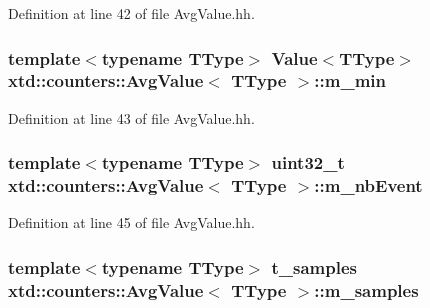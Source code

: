 Definition at line 42 of file Avg\+Value.\+hh.

\subsubsection[{\texorpdfstring{m\+\_\+min}{m_min}}]{\setlength{\rightskip}{0pt plus 5cm}template$<$typename T\+Type$>$ {\bf Value}$<$T\+Type$>$ {\bf xtd\+::counters\+::\+Avg\+Value}$<$ T\+Type $>$\+::m\+\_\+min\hspace{0.3cm}{\ttfamily [protected]}}\hypertarget{classxtd_1_1counters_1_1AvgValue_a8e217891d937894812b5edfcf6a5ce0e}{}\label{classxtd_1_1counters_1_1AvgValue_a8e217891d937894812b5edfcf6a5ce0e}


Definition at line 43 of file Avg\+Value.\+hh.

\subsubsection[{\texorpdfstring{m\+\_\+nb\+Event}{m_nbEvent}}]{\setlength{\rightskip}{0pt plus 5cm}template$<$typename T\+Type$>$ uint32\+\_\+t {\bf xtd\+::counters\+::\+Avg\+Value}$<$ T\+Type $>$\+::m\+\_\+nb\+Event\hspace{0.3cm}{\ttfamily [protected]}}\hypertarget{classxtd_1_1counters_1_1AvgValue_aba4c4022706bda9bfdedea3cb9c3647a}{}\label{classxtd_1_1counters_1_1AvgValue_aba4c4022706bda9bfdedea3cb9c3647a}


Definition at line 45 of file Avg\+Value.\+hh.

\subsubsection[{\texorpdfstring{m\+\_\+samples}{m_samples}}]{\setlength{\rightskip}{0pt plus 5cm}template$<$typename T\+Type$>$ {\bf t\+\_\+samples} {\bf xtd\+::counters\+::\+Avg\+Value}$<$ T\+Type $>$\+::m\+\_\+samples\hspace{0.3cm}{\ttfamily [protected]}}\hypertarget{classxtd_1_1counters_1_1AvgValue_a787afb6a601eb29f48a0fd247524cf84}{}\label{classxtd_1_1counters_1_1AvgValue_a787afb6a601eb29f48a0fd247524cf84}


